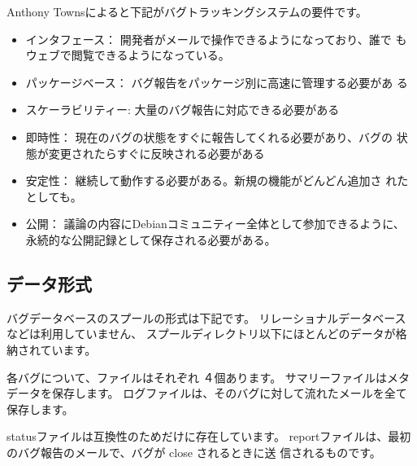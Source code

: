 \documentclass[mingoth,a4paper]{jsarticle}
\begin{document}
Anthony Townsによると下記がバグトラッキングシステムの要件です。

\begin{itemize}
 \item インタフェース： 開発者がメールで操作できるようになっており、誰で
       もウェブで閲覧できるようになっている。
 \item パッケージベース： バグ報告をパッケージ別に高速に管理する必要があ
       る
 \item スケーラビリティー: 大量のバグ報告に対応できる必要がある
 \item 即時性： 現在のバグの状態をすぐに報告してくれる必要があり、バグの
       状態が変更されたらすぐに反映される必要がある
 \item 安定性： 継続して動作する必要がある。新規の機能がどんどん追加さ
       れたとしても。
 \item 公開： 議論の内容にDebianコミュニティー全体として参加できるように、
       永続的な公開記録として保存される必要がある。
\end{itemize}

\subsection{データ形式}

バグデータベースのスプールの形式は下記です。
リレーショナルデータベースなどは利用していません、
スプールディレクトリ以下にほとんどのデータが格納されています。

各バグについて、ファイルはそれぞれ
４個あります。
サマリーファイルはメタデータを保存します。
ログファイルは、そのバグに対して流れたメールを全て保存します。

statusファイルは互換性のためだけに存在しています。
reportファイルは、最初のバグ報告のメールで、バグが close されるときに送
信されるものです。
\end{document}
